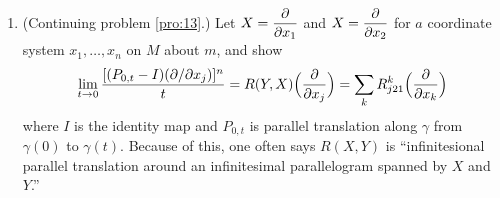 \documentclass[../main]{subfiles}
\begin{document}
\begin{enumerate}
    \item\label{pro:48} (Continuing problem \ref{pro:13}.) Let $X=\dfrac{\partial }{\partial x_1}$ and $X=\dfrac{\partial }{\partial x_2}$ for $a$ coordinate system $x_1, \dots, x_n$ on $M$ about $m$, and show \[\lim _{t\to0}\dfrac{[(P_{0,t}-I)(\partial / \partial x_j)]^n}{t} =R(Y, X)\Big(\dfrac{\partial }{\partial x_j}\Big)=\sum_{k} R_{j21}^{k}\Big(\dfrac{\partial }{\partial x_k}\Big)\] where $I$ is the identity map and $P_{0, t}$ is parallel translation along $\gamma$ from $\gamma(0)$ to $\gamma(t)$. Because of this, one often says $R(X, Y)$ is ``infinitesional parallel translation around an infinitesimal parallelogram spanned by $X$ and $Y$.''
\end{enumerate}
\end{document}

